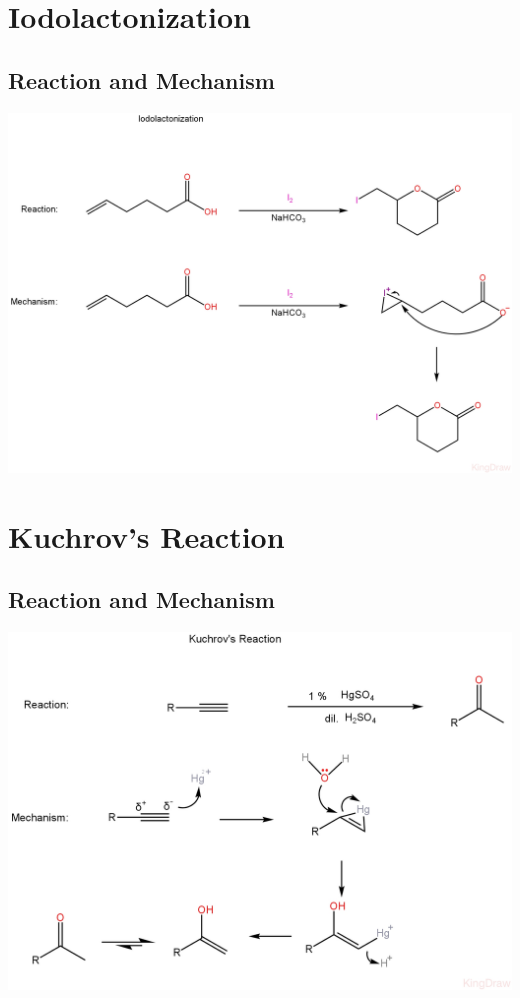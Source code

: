 \documentclass{article}
\begin{document}
\section{Iodolactonization}
\subsection{Reaction and Mechanism}
\includegraphics[scale=0.23]{Iodolactonization_1722375521493.JPEG}

\section{Kuchrov's Reaction}
\subsection{Reaction and Mechanism}
\includegraphics[scale=0.26]{Kuchrov_1722377904329.JPEG}
\end{document}
